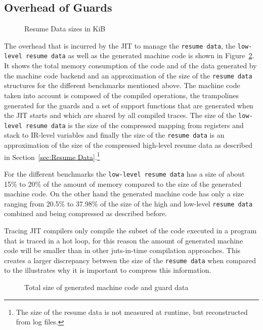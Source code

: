 \documentclass[10pt,preprint]{sigplanconf}
\begin{document}
\subsection{Overhead of Guards}
\label{sub:guard_overhead}
\begin{figure}
    
    \caption{Resume Data sizes in KiB}
    \label{fig:resume_data_sizes}
\end{figure}

The overhead that is incurred by the JIT to manage the \texttt{resume data},
the \texttt{low-level resume data} as well as the generated machine code is
shown in Figure~\ref{fig:backend_data}. It shows the total memory consumption
of the code and of the data generated by the machine code backend and an
approximation of the size of the \texttt{resume data} structures for the
different benchmarks mentioned above. The machine code taken into account is
composed of the compiled operations, the trampolines generated for the guards
and a set of support functions that are generated when the JIT starts and which
are shared by all compiled traces. The size of the \texttt{low-level resume
data} is the size of the compressed mapping from registers and stack to
IR-level variables and finally the size of the \texttt{resume data} is an
approximation of the size of the compressed high-level resume data as described
in Section~\ref{sec:Resume Data}.\footnote{
The size of the resume data is not measured at runtime, but reconstructed from
log files.}

For the different benchmarks the \texttt{low-level resume data} has a size of
about 15\% to 20\% of the amount of memory compared to the size of the
generated machine code. On the other hand the generated machine code has only a
size ranging from 20.5\% to 37.98\% of the size of the high and low-level
\texttt{resume data} combined and being compressed as described before.

Tracing JIT compilers only compile the subset of the code executed in a program
that is traced in a hot loop, for this reason the amount of generated machine
code will be smaller than in other juts-in-time compilation approaches.  This
creates a larger discrepancy between the size of the \texttt{resume data} when
compared to the illustrates why it is important to compress this information.

\begin{figure}
    
    \caption{Total size of generated machine code and guard data}
    \label{fig:backend_data}
\end{figure}
\end{document}
